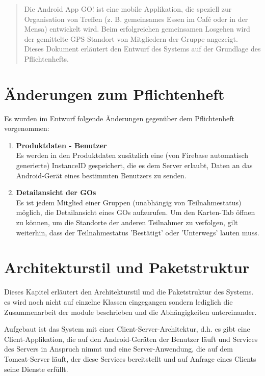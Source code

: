 


\newpage

\begin{abstract}
Die Android App GO! ist eine mobile Applikation, die speziell zur Organisation von Treffen (z. B. gemeinsames Essen im Café oder in der Mensa) entwickelt wird. Beim erfolgreichen gemeinsamen Losgehen wird der gemittelte GPS-Standort von Mitgliedern der Gruppe angezeigt.\\

Dieses Dokument erläutert den Entwurf des Systems auf der Grundlage des Pflichtenhefts.
\end{abstract}

\newpage

\tableofcontents

\newpage

\section{Änderungen zum Pflichtenheft}

Es wurden im Entwurf folgende Änderungen gegenüber dem Pflichtenheft vorgenommen:
\begin{enumerate}
	\item \textbf{Produktdaten - Benutzer} \\
	Es werden in den Produktdaten zusätzlich eine (von Firebase automatisch generierte) InstanceID gespeichert, die es dem Server erlaubt, Daten an das Android-Gerät eines bestimmten Benutzers zu senden.
	\item \textbf{Detailansicht der GOs} \\
	Es ist jedem Mitglied einer Gruppen (unabhängig von Teilnahmestatus) möglich, die Detailansicht eines GOs aufzurufen. Um den Karten-Tab öffnen zu können, um die Standorte der anderen Teilnahmer zu verfolgen, gilt weiterhin, dass der Teilnahmestatus 'Bestätigt' oder 'Unterwegs' lauten muss.
\end{enumerate}

\newpage

\section{Architekturstil und Paketstruktur}
Dieses Kapitel erläutert den Architekturstil und die Paketstruktur des Systems. es wird noch nicht auf einzelne Klassen eingegangen sondern lediglich die Zusammenarbeit der module beschrieben und die Abhängigkeiten untereinander.

Aufgebaut ist das System mit einer Client-Server-Architektur, d.h. es gibt eine Client-Applikation, die auf den Android-Geräten der Benutzer läuft und Services des Servers in Anspruch nimmt und eine Server-Anwendung, die auf dem Tomcat-Server läuft, der diese Services bereitstellt und auf Anfrage eines Clients seine Dienste erfüllt.

